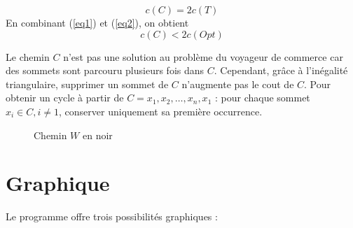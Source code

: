 \documentclass[a4paper,11pt]{article}
\begin{document}
\begin{equation}
c(C) = 2c(T)
\label{eq2}
\end{equation}
En combinant (\ref{eq1}) et (\ref{eq2}), on obtient
\begin{equation}
c(C) < 2c(Opt)
\label{eq3}
\end{equation}

Le chemin $C$ n'est pas une solution au problème du voyageur de commerce car des sommets sont parcouru plusieurs fois dans $C$. Cependant, grâce à l'inégalité triangulaire, supprimer un sommet de $C$ n'augmente pas le cout de $C$.
Pour obtenir un cycle à partir de $C = x_1, x_2, \ldots, x_n, x_1$ :
pour chaque sommet $x_i \in C, i\neq1$, conserver uniquement sa première occurrence.

\begin{figure}[!h]
\centering
{}
\caption{Chemin $W$ en noir}
\end{figure}

\section{Graphique} %
Le programme offre trois possibilités graphiques :
\end{document}
